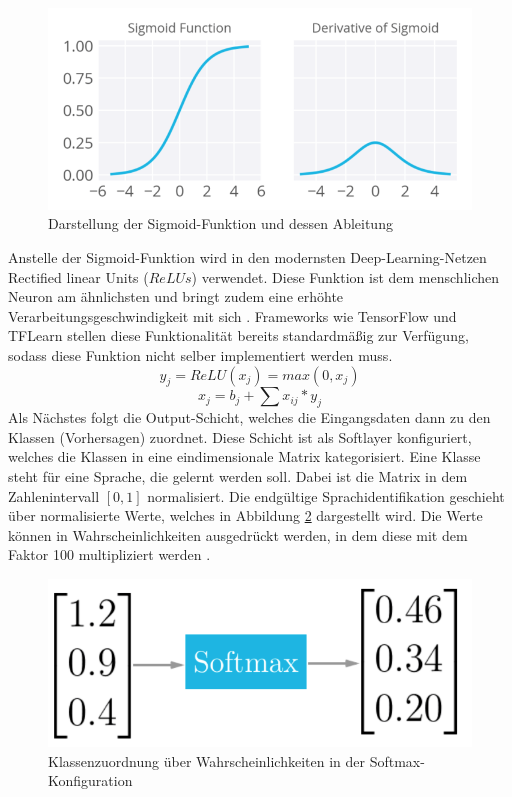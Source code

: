 \begin{figure}[h!]
	\centering
	\includegraphics[width=1.0\linewidth]{images/sigmund}
	\caption{Darstellung der Sigmoid-Funktion und dessen Ableitung \cite{Kulbear.2017}} %
	\label{fig:features11.0}
\end{figure}
Anstelle der Sigmoid-Funktion wird in den modernsten Deep-Learning-Netzen Rectified linear Units ($ReLUs$) verwendet. Diese Funktion ist dem menschlichen Neuron am ähnlichsten und bringt zudem eine erhöhte Verarbeitungsgeschwindigkeit mit sich \cite{zeiler.2013}. Frameworks wie TensorFlow und TFLearn stellen diese Funktionalität bereits standardmäßig zur Verfügung, sodass diese Funktion nicht selber implementiert werden muss.
\begin{equation*}
y_{j} = ReLU(x_{j}) = max(0,x_{j}) 
\label{eq:ReLU}
\end{equation*}
\begin{equation}
x_{ j } = b_{ j } + \sum{ }{ }{ x_{ ij } * y_{j}}
\label{eq:Gewichte}
\end{equation}
Als Nächstes folgt die Output-Schicht, welches die Eingangsdaten dann zu den Klassen (Vorhersagen) zuordnet. Diese Schicht ist als Softlayer konfiguriert, welches die Klassen in eine eindimensionale Matrix kategorisiert. Eine Klasse steht für eine Sprache, die gelernt werden soll. Dabei ist die Matrix in dem Zahlenintervall $[0,1]$ normalisiert. Die endgültige Sprachidentifikation geschieht über normalisierte Werte, welches in Abbildung \ref{fig:soft} dargestellt wird. Die Werte können in Wahrscheinlichkeiten ausgedrückt werden, in dem diese mit dem Faktor 100 multipliziert werden \cite{Kulbear.2017}.
\begin{figure}[h!]
	\centering
	\includegraphics[width=0.7\linewidth]{images/softmax}
	\caption{Klassenzuordnung über Wahrscheinlichkeiten in der Softmax-Konfiguration \cite{Kulbear.2017}} %
	\label{fig:soft}
\end{figure}
